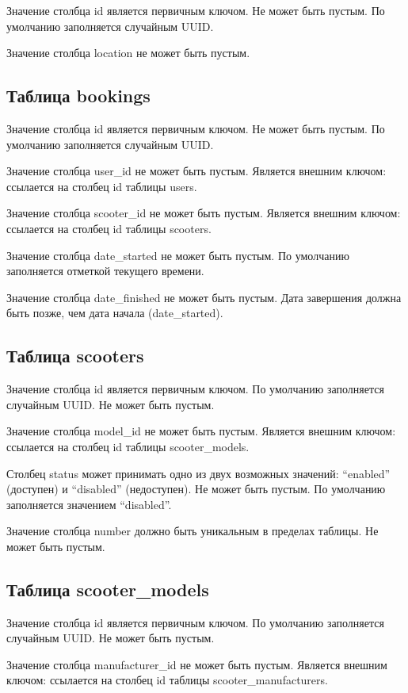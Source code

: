 Значение столбца id является первичным ключом. Не может быть пустым. По умолчанию заполняется случайным UUID.

Значение столбца location не может быть пустым.

\subsection{Таблица bookings}

Значение столбца id является первичным ключом. Не может быть пустым. По умолчанию заполняется случайным UUID.

Значение столбца user\_id не может быть пустым. Является внешним ключом: ссылается на столбец id таблицы users.

Значение столбца scooter\_id не может быть пустым. Является внешним ключом: ссылается на столбец id таблицы scooters.

Значение столбца date\_started не может быть пустым. По умолчанию заполняется отметкой текущего времени.

Значение столбца date\_finished не может быть пустым. Дата завершения должна быть позже, чем дата начала (date\_started).

\subsection{Таблица scooters}

Значение столбца id является первичным ключом. По умолчанию заполняется случайным UUID. Не может быть пустым.

Значение столбца model\_id не может быть пустым. Является внешним ключом: ссылается на столбец id таблицы scooter\_models.

Столбец status может принимать одно из двух возможных значений: \enquote{enabled} (доступен) и \enquote{disabled} (недоступен). Не может быть пустым. По умолчанию заполняется значением \enquote{disabled}.

Значение столбца number должно быть уникальным в пределах таблицы. Не может быть пустым.

\subsection{Таблица scooter\_models}

Значение столбца id является первичным ключом. По умолчанию заполняется случайным UUID. Не может быть пустым.

Значение столбца manufacturer\_id не может быть пустым. Является внешним ключом: ссылается на столбец id таблицы scooter\_manufacturers.

